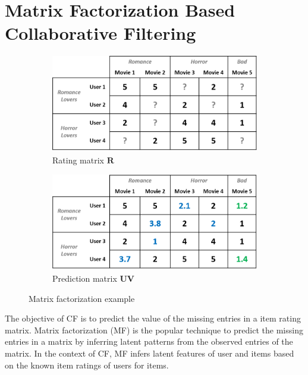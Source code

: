 \documentclass[master,english,final]{kaist-ucs}
\begin{document}
\section{Matrix Factorization Based Collaborative Filtering}
\begin{figure}[b]
    \centering
    \begin{subfigure}[b]{0.45\textwidth}
        \centering
        \includegraphics[width=\textwidth]{figure/mf_before_rating}
        \caption{Rating matrix $\bm{R}$}
        \label{mf_before_rating}
    \end{subfigure}
    \begin{subfigure}[b]{0.45\textwidth}
        \centering
        \includegraphics[width=\textwidth]{figure/mf_before_prediction}
        \caption{Prediction matrix $\bm{UV}$}
        \label{mf_before_prediction}
    \end{subfigure}
    \caption{Matrix factorization example}
    \label{mf_base}
\end{figure}
The objective of CF is to predict the value of the missing entries in a item rating matrix.
Matrix factorization (MF) is the popular technique to predict the missing entries in a matrix by inferring latent patterns from the observed entries of the matrix.
In the context of CF, MF infers latent features of user and items based on the known item ratings of users for items.
\end{document}
